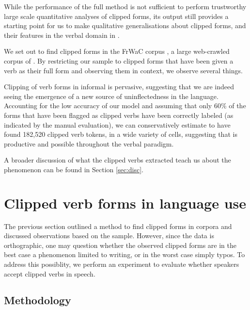 \documentclass[output=paper,colorlinks,citecolor=brown]{langscibook}
\begin{document}
While the performance of the full method is not sufficient to perform trustworthy large scale quantitative analyses of clipped forms, its output still provides a starting point for us to make qualitative generalisations about clipped forms, and their features in the verbal domain in .

We set out to find clipped forms in the FrWaC corpus \citep{baronibernardiniferraresizanchetta2009}, a large web-crawled corpus of . By restricting our sample to clipped forms that have been given a verb as their full form and observing them in context, we observe several things. 

Clipping of verb forms in informal  is pervasive, suggesting that we are indeed seeing the emergence of a new source of uninflectedness in the  language. Accounting for the low accuracy of our model and assuming that only 60\% of the forms that have been flagged as clipped verbs have been correctly labeled (as indicated by the manual evaluation), we can conservatively estimate to have found 182,520 clipped verb tokens, in a wide variety of cells, suggesting that  is productive and possible throughout the verbal paradigm.

A broader discussion of what the clipped verbs extracted teach us about the phenomenon can be found in Section \ref{sec:disc}.

\section{Clipped verb forms in language use}\label{sec:experiment}
The previous section outlined a method to find clipped forms in corpora and discussed observations based on the sample. However, since the data is orthographic, one may question whether the observed clipped forms are in the best case a phenomenon limited to writing, or in the worst case simply typos. To address this possiblity, we perform an experiment to evaluate whether  speakers accept clipped verbs in speech.

\subsection{Methodology}
\end{document}
